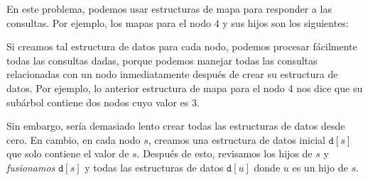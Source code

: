 En este problema, podemos usar estructuras de mapa
para responder a las consultas.
Por ejemplo, los mapas para el nodo 4 y
sus hijos son los siguientes:

\begin{center}
\end{center}

Si creamos tal estructura de datos para cada nodo,
podemos procesar fácilmente todas las consultas dadas,
porque podemos manejar todas las consultas relacionadas
con un nodo inmediatamente después de crear su
estructura de datos. Por ejemplo, lo anterior
estructura de mapa para el nodo 4
nos dice que su subárbol
contiene dos nodos cuyo valor es 3.

Sin embargo, sería demasiado lento crear
todas las estructuras de datos desde cero.
En cambio, en cada nodo $s$,
creamos una estructura de datos inicial $\texttt{d}[s]$
que solo contiene el valor de $s$.
Después de esto, revisamos los hijos de $s$ y
\emph{fusionamos} $\texttt{d}[s]$ y
todas las estructuras de datos
$\texttt{d}[u]$ donde $u$ es un hijo de $s$.

